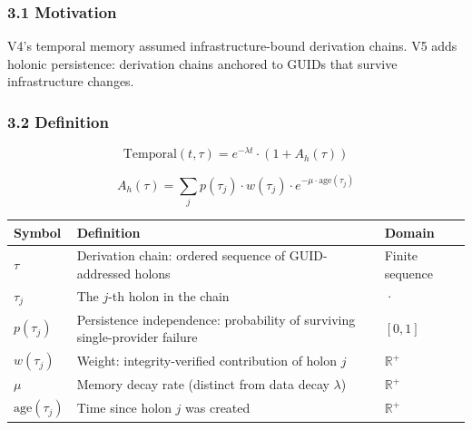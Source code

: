 \documentclass[
  11pt,
]{article}
\newcounter{none} %
\begin{document}
\subsubsection{3.1 Motivation}\label{motivation}

V4's temporal memory assumed infrastructure-bound derivation chains. V5
adds holonic persistence: derivation chains anchored to GUIDs that
survive infrastructure changes.

\subsubsection{3.2 Definition}\label{definition}

\[\text{Temporal}(t, \tau) = e^{-\lambda t} \cdot (1 + A_h(\tau))\]

\[A_h(\tau) = \sum_j p(\tau_j) \cdot w(\tau_j) \cdot e^{-\mu \cdot \text{age}(\tau_j)}\]

{\def\LTcaptype{none} %
\begin{longtable}[]{@{}
  >{\raggedright\arraybackslash}p{}
  >{\raggedright\arraybackslash}p{}
  >{\raggedright\arraybackslash}p{}@{}}
\toprule\noalign{}
\begin{minipage}[b]{\linewidth}\raggedright
Symbol
\end{minipage} & \begin{minipage}[b]{\linewidth}\raggedright
Definition
\end{minipage} & \begin{minipage}[b]{\linewidth}\raggedright
Domain
\end{minipage} \\
\midrule\noalign{}
\endhead
\bottomrule\noalign{}
\endlastfoot
\(\tau\) & Derivation chain: ordered sequence of GUID-addressed holons &
Finite sequence \\
\(\tau_j\) & The \(j\)-th holon in the chain & · \\
\(p(\tau_j)\) & Persistence independence: probability of surviving
single-provider failure & \([0, 1]\) \\
\(w(\tau_j)\) & Weight: integrity-verified contribution of holon \(j\) &
\(\mathbb{R}^+\) \\
\(\mu\) & Memory decay rate (distinct from data decay \(\lambda\)) &
\(\mathbb{R}^+\) \\
\(\text{age}(\tau_j)\) & Time since holon \(j\) was created &
\(\mathbb{R}^+\) \\
\end{longtable}
}
\end{document}
